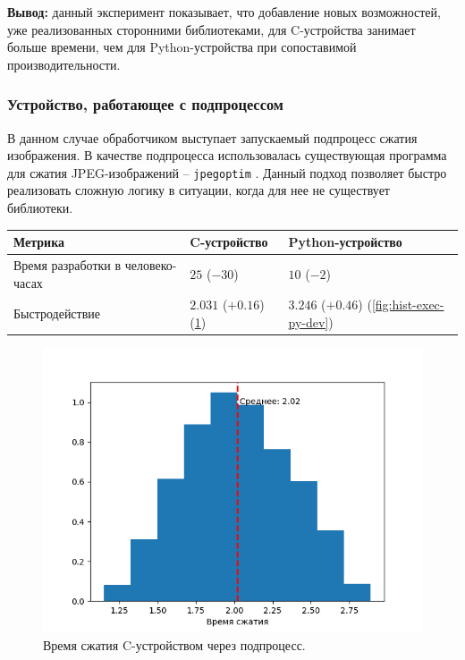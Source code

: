 \textbf{Вывод:} данный эксперимент показывает, что добавление новых возможностей,
уже реализованных сторонними библиотеками, для C-устройства занимает больше времени,
чем для Python-устройства при сопоставимой производительности.

\subsubsection{Устройство, работающее с подпроцессом}\label{sec:ch3/sec2/sec2/sec2}

В данном случае обработчиком выступает запускаемый подпроцесс сжатия
изображения. В качестве подпроцесса использовалась существующая программа
для сжатия JPEG-изображений -- \texttt{jpegoptim} \cite{jpegoptim}.
Данный подход позволяет быстро реализовать сложную логику в ситуации, когда
для нее не существует библиотеки.

\begin{longtable}{| p{5cm} | p{5cm} | p{5cm} |}
    \hline
    Метрика & C-устройство & Python-устройство \\
    \hline
        Время разработки в человеко-часах &
        $25$ ($-30$) &
        $10$ ($-2$) \\
    \hline
        Быстродействие &
        $2.031$ ($+0.16$) (\cref{fig:hist-exec-c-dev}) &
        $3.246$ ($+0.46$) (\cref{fig:hist-exec-py-dev}) \\
    \hline
\end{longtable}

\begin{figure}[!htbp]
    \centering
    \begin{adjustbox}{max totalsize={0.8\textwidth}{\textheight}}
        \includegraphics{images/hist-exec-c-dev.png}
    \end{adjustbox}
    \caption{Время сжатия C-устройством через подпроцесс.}\label{fig:hist-exec-c-dev}
\end{figure}


